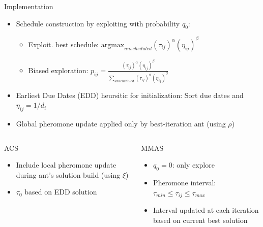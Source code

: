 \documentclass[10pt]{beamer}
\begin{document}
\begin{frame}{Implementation}{}
    \begin{itemize}
      \item Schedule construction by exploiting with probability $q_0$:
      \begin{itemize}
        \item Exploit. best schedule: $\mathrm{argmax}_{unscheduled}(\tau_{ij})^\alpha (\eta_{ij})^\beta$
        \item Biased exploration: $p_{ij} = \frac{(\tau_{ij})^\alpha (\eta_{ij})^\beta}{\sum_{unscheduled}{(\tau_{ij})^\alpha (\eta_{ij})^\beta}}$
      \end{itemize}
      \item Earliest Due Dates (EDD) heursitic for initialization: Sort due dates and $\eta_{ij} = 1 / d_i$
      \item Global pheromone update applied only by best-iteration ant (using $\rho$)
    \end{itemize}
    \begin{columns}[T]
     \begin{column}{.5\textwidth}
         \begin{block}{ACS}
            \begin{itemize}
              \item Include local pheromone update during ant's solution build (using $\xi$)
              \item $\tau_0$ based on EDD solution
            \end{itemize}
         \end{block}
       \end{column}
       \begin{column}{.5\textwidth}
           \begin{block}{MMAS}
               \begin{itemize}
                   \item $q_0 = 0$: only explore
                   \item Pheromone interval: $\tau_{min} \le \tau_{ij} \le \tau_{max}$
                   \item Interval updated at each iteration based on current best solution
               \end{itemize}
           \end{block}
       \end{column}
   \end{columns}
\end{frame}
\end{document}
